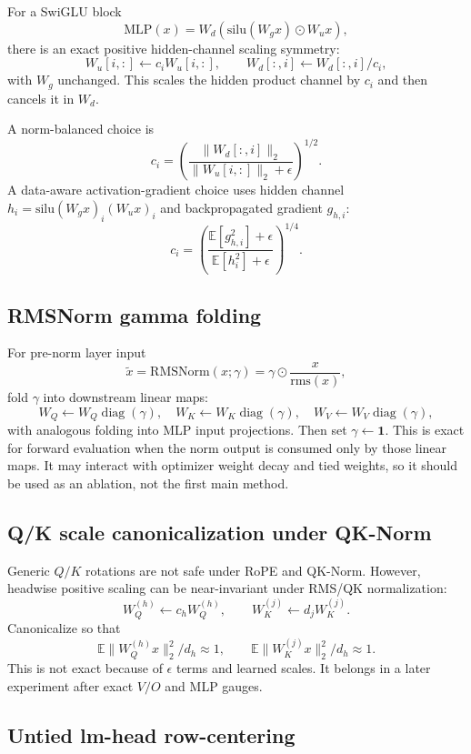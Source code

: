 \documentclass[11pt]{article}
\newcommand{\E}{\mathbb{E}}
\begin{document}
For a SwiGLU block
\[
    \mathrm{MLP}(x)=W_d\left(\mathrm{silu}(W_gx)\odot W_ux\right),
\]
there is an exact positive hidden-channel scaling symmetry:
\[
    W_u[i,:]\leftarrow c_iW_u[i,:],
    \qquad
    W_d[:,i]\leftarrow W_d[:,i]/c_i,
\]
with $W_g$ unchanged. This scales the hidden product channel by $c_i$ and then cancels it in $W_d$.

A norm-balanced choice is
\[
    c_i=\left(\frac{\|W_d[:,i]\|_2}{\|W_u[i,:]\|_2+\epsilon}\right)^{1/2}.
\]
A data-aware activation-gradient choice uses hidden channel $h_i=\mathrm{silu}(W_gx)_i(W_ux)_i$ and backpropagated gradient $g_{h,i}$:
\[
    c_i=\left(\frac{\E[g_{h,i}^2]+\epsilon}{\E[h_i^2]+\epsilon}\right)^{1/4}.
\]

\subsection{RMSNorm gamma folding}

For pre-norm layer input
\[
    \tilde x=\mathrm{RMSNorm}(x;\gamma)=\gamma\odot \frac{x}{\mathrm{rms}(x)},
\]
fold $\gamma$ into downstream linear maps:
\[
    W_Q\leftarrow W_Q\operatorname{diag}(\gamma),
    \quad
    W_K\leftarrow W_K\operatorname{diag}(\gamma),
    \quad
    W_V\leftarrow W_V\operatorname{diag}(\gamma),
\]
with analogous folding into MLP input projections. Then set $\gamma\leftarrow \mathbf 1$. This is exact for forward evaluation when the norm output is consumed only by those linear maps. It may interact with optimizer weight decay and tied weights, so it should be used as an ablation, not the first main method.

\subsection{Q/K scale canonicalization under QK-Norm}

Generic $Q/K$ rotations are not safe under RoPE and QK-Norm. However, headwise positive scaling can be near-invariant under RMS/QK normalization:
\[
    W_Q^{(h)}\leftarrow c_hW_Q^{(h)},
    \qquad
    W_K^{(j)}\leftarrow d_jW_K^{(j)}.
\]
Canonicalize so that
\[
    \E\|W_Q^{(h)}x\|_2^2/d_h\approx 1,
    \qquad
    \E\|W_K^{(j)}x\|_2^2/d_h\approx 1.
\]
This is not exact because of $\epsilon$ terms and learned scales. It belongs in a later experiment after exact $V/O$ and MLP gauges.

\subsection{Untied lm-head row-centering}
\end{document}
